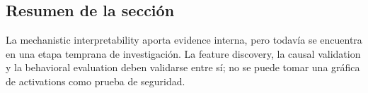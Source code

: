 \subsection{Resumen de la sección}

La mechanistic interpretability aporta evidence interna, pero todavía se encuentra en una etapa temprana de investigación. La feature discovery, la causal validation y la behavioral evaluation deben validarse entre sí; no se puede tomar una gráfica de activations como prueba de seguridad.
